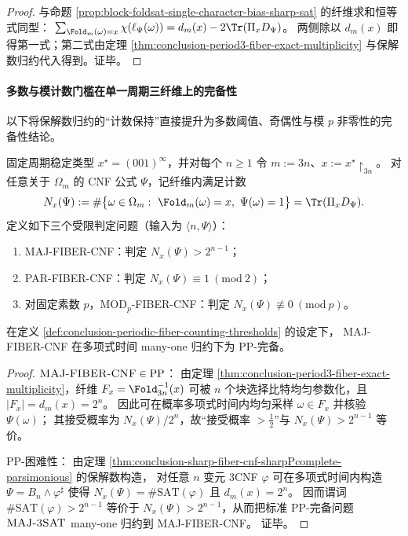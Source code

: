 \begin{proof}
与命题 \ref{prop:block-foldsat-single-character-bias-sharp-sat} 的纤维求和恒等式同型：
\(
\sum_{\Fold_m(\omega)=x}\chi(\ell_\Psi(\omega))=d_m(x)-2\Tr(\Pi_xD_\Psi)
\)。
两侧除以 \(d_m(x)\) 即得第一式；第二式由定理 \ref{thm:conclusion-period3-fiber-exact-multiplicity} 与保解数归约代入得到。证毕。
\end{proof}

\paragraph{多数与模计数门槛在单一周期三纤维上的完备性}
以下将保解数归约的“计数保持”直接提升为多数阈值、奇偶性与模 \(p\) 非零性的完备性结论。

\begin{definition}[固定周期三纤维上的多数与模计数判定]\label{def:conclusion-periodic-fiber-counting-thresholds}
固定周期稳定类型 \(x^\star=(001)^\infty\)，并对每个 \(n\ge 1\) 令 \(m:=3n\)、\(x:=x^\star\!\upharpoonright_{3n}\)。
对任意关于 \(\Omega_m\) 的 CNF 公式 \(\Psi\)，记纤维内满足计数
\[
N_x(\Psi):=\#\bigl\{\omega\in\Omega_m:\ \Fold_m(\omega)=x,\ \Psi(\omega)=1\bigr\}
=\Tr(\Pi_xD_\Psi).
\]
定义如下三个受限判定问题（输入为 \(\langle n,\Psi\rangle\)）：
\begin{enumerate}
  \item \textsc{MAJ-FIBER-CNF}：判定 \(N_x(\Psi)>2^{n-1}\)；
  \item \textsc{PAR-FIBER-CNF}：判定 \(N_x(\Psi)\equiv 1\ (\mathrm{mod}\ 2)\)；
  \item 对固定素数 \(p\)，\textsc{MOD}\(_p\)\textsc{-FIBER-CNF}：判定 \(N_x(\Psi)\not\equiv 0\ (\mathrm{mod}\ p)\)。
\end{enumerate}
\end{definition}

\begin{theorem}\label{thm:conclusion-periodic-fiber-majority-pp-complete}
在定义 \ref{def:conclusion-periodic-fiber-counting-thresholds} 的设定下，
{\normalfont\textsc{MAJ-FIBER-CNF}} 在多项式时间 many-one 归约下为 \(\mathrm{PP}\)-完备。
\end{theorem}
\begin{proof}
\(\textsc{MAJ-FIBER-CNF}\in\mathrm{PP}\)：
由定理 \ref{thm:conclusion-period3-fiber-exact-multiplicity}，纤维 \(F_x=\Fold_{3n}^{-1}(x)\) 可被 \(n\) 个块选择比特均匀参数化，且 \(|F_x|=d_m(x)=2^n\)。
因此可在概率多项式时间内均匀采样 \(\omega\in F_x\) 并核验 \(\Psi(\omega)\)；
其接受概率为 \(N_x(\Psi)/2^n\)，故“接受概率 \(>\tfrac12\)”与 \(N_x(\Psi)>2^{n-1}\) 等价。
\par
\(\mathrm{PP}\)-困难性：
由定理 \ref{thm:conclusion-sharp-fiber-cnf-sharpPcomplete-parsimonious} 的保解数构造，
对任意 \(n\) 变元 3CNF \(\varphi\) 可在多项式时间内构造 \(\Psi=B_n\wedge\varphi^\sharp\) 使得
\(
N_x(\Psi)=\#\mathrm{SAT}(\varphi)
\)
且 \(d_m(x)=2^n\)。
因而谓词 \(\#\mathrm{SAT}(\varphi)>2^{n-1}\) 等价于 \(N_x(\Psi)>2^{n-1}\)，从而把标准 \(\mathrm{PP}\)-完备问题 \(\textsc{MAJ-3SAT}\) many-one 归约到 \textsc{MAJ-FIBER-CNF}。
证毕。
\end{proof}

